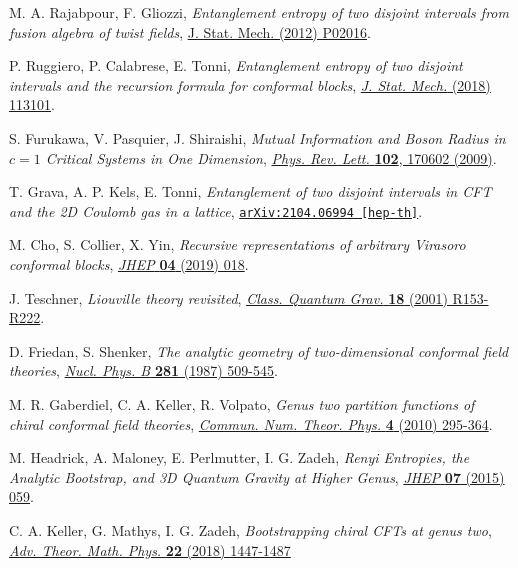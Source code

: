 \documentclass[a4paper,11pt]{article}
\begin{document}
\begin{thebibliography}{99}
 M. A. Rajabpour, F. Gliozzi, \emph{Entanglement entropy of two disjoint intervals from fusion algebra of twist fields},
\href{https://doi.org/10.1088/1742-5468/2012/02/P02016}{J. Stat. Mech. (2012) P02016}.

 P. Ruggiero, P. Calabrese, E. Tonni, \emph{Entanglement entropy of two disjoint intervals and the recursion formula
for conformal blocks}, \href{https://doi.org/10.1088/1742-5468/aae5a8}{\emph{J. Stat. Mech.} (2018) 113101}.

  S. Furukawa, V. Pasquier, J. Shiraishi, \emph{Mutual Information and Boson Radius in $c=1$ Critical Systems in One Dimension}, \href{https://doi.org/10.1103/PhysRevLett.102.170602}{\emph{Phys. Rev. Lett.} {\bf 102}, 170602 (2009)}.

 T. Grava, A. P. Kels, E. Tonni, \emph{Entanglement of two disjoint intervals in CFT and the 2D Coulomb gas in a lattice},
\href{https://arxiv.org/abs/2104.06994}{\texttt{arXiv:2104.06994 [hep-th]}}.

 M. Cho, S. Collier, X. Yin, \emph{Recursive representations of arbitrary Virasoro conformal blocks}, 
\href{https://doi.org/10.1007/JHEP04(2019)018}{\emph{JHEP} {\bf 04} (2019) 018}.

 J. Teschner, \emph{Liouville theory revisited}, \href{https://doi.org/10.1088/0264-9381/18/23/201}{\emph{Class. Quantum Grav.} {\bf 18} (2001) R153-R222}.

 D. Friedan, S. Shenker, \emph{The analytic geometry of two-dimensional conformal field theories}, \href{https://doi.org/10.1016/0550-3213(87)90418-4}{\emph{Nucl. Phys. B} {\bf 281} (1987) 509-545}.

 M. R. Gaberdiel, C. A. Keller, R. Volpato, \emph{Genus two partition functions of chiral conformal field theories},
\href{https://dx.doi.org/10.4310/CNTP.2010.v4.n2.a2}{\emph{Commun. Num. Theor. Phys.} {\bf 4} (2010) 295-364}.

 M. Headrick, A. Maloney, E. Perlmutter, I. G. Zadeh, \emph{Renyi Entropies, the Analytic Bootstrap, and 3D Quantum Gravity at Higher Genus}, \href{https://doi.org/10.1007/JHEP07(2015)059}{\emph{JHEP} {\bf 07} (2015) 059}.

 C. A. Keller, G. Mathys, I. G. Zadeh, \emph{Bootstrapping chiral CFTs at genus two},
\href{https://dx.doi.org/10.4310/ATMP.2018.v22.n6.a3}{\emph{Adv. Theor. Math. Phys.} {\bf 22} (2018) 1447-1487}


\end{thebibliography}
\end{document}
